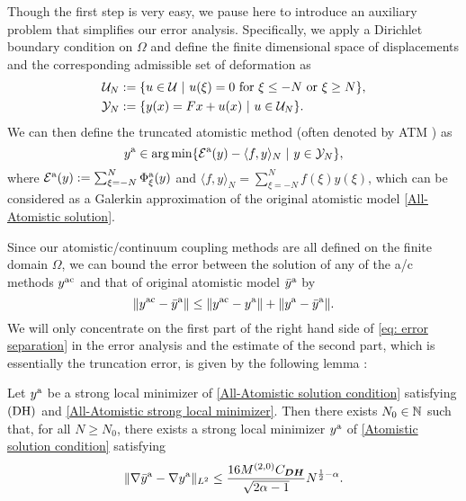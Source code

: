 	Though the first step is very easy, we pause here to introduce an auxiliary problem that simplifies our error analysis. Specifically, we apply a Dirichlet boundary condition on $\Omega$ and define the finite dimensional space of displacements and the corresponding admissible set of deformation as
	\begin{align*}
		\mathcal{U}_{N}&:= \{u\in\mathcal{U} \ | \ u(\xi) = 0 \text{ for }\xi \le -N \text{ or } \xi \ge N\},\\
		\mathcal{Y}_{N}&:= \{y(x) = Fx + u(x) \ | \ u \in \mathcal{U}_{N}\}.
	\end{align*}
	We can then define the truncated atomistic method (often denoted by ATM \cite{2016_EV_CO_AS_Boundary_Conditions_for_Crystal_Lattice_ARMA,2013_ML_CO_AC_Coupling_ACTANUM}) as 
	\begin{equation}\label{Atomistic solution condition}
		y^{{\rm a}} \in \arg \min \{\mathcal{E}^{{\rm a}}(y) - \langle f,y \rangle_{N} \ | \ y \in \mathcal{Y}_{N} \},
	\end{equation}
	where $\mathcal{E}^{{\rm a}}(y): =  \sum_{\xi =-N}^{N}\Phi^{{\rm a}}_{\xi}(y)$ and $\langle f,y\rangle_{N} = \sum_{\xi =-N}^{N} f(\xi)y(\xi)$, which can be considered as a Galerkin approximation of the original atomistic model \eqref{All-Atomistic solution}. 
	
	Since our atomistic/continuum coupling methods are all defined on the finite domain $\Omega$, we can bound the error between the solution of any of the a/c methods $y^{\rm ac}$ and that of original atomistic model $\bar{y}^{{\rm a}}$ by 
	\begin{equation}
		\label{eq: error separation}
		\| y^{\rm ac} - \bar{y}^{{\rm a}} \| \le \|y^{\rm ac} - y^{{\rm a}} \| + \|y^{{\rm a}} - \bar{y}^{{\rm a}} \|.
	\end{equation} 
	We will only concentrate on the first part of the right hand side of \eqref{eq: error separation} in the error analysis and the estimate of the second part, which is essentially the truncation error, is given by the following lemma \cite[Theorem 3.14]{2013_ML_CO_AC_Coupling_ACTANUM}:
	
	\begin{lemma}
		Let $y^{{\rm a}}$ be a strong local minimizer of \eqref{All-Atomistic solution condition} satisfying $\textbf{\rm (DH)}$ and \eqref{All-Atomistic strong local minimizer}. Then there exists $N_{0} \in \mathbb{N}$ such that, for all $N \ge N_{0}$, there exists a strong local minimizer $y^{{\rm a}}$ of \eqref{Atomistic solution condition} satisfying
		\begin{equation}\label{Truncation error}
			\Vert \nabla \bar{y}^{{\rm a}} - \nabla y^{{\rm a}}\Vert_{L^{2}} \le \frac{16M^{(2,0)}C_{\bm{DH}}}{\sqrt{2\alpha-1}} N^{\frac{1}{2}-\alpha}.
		\end{equation}
	\end{lemma}
	
